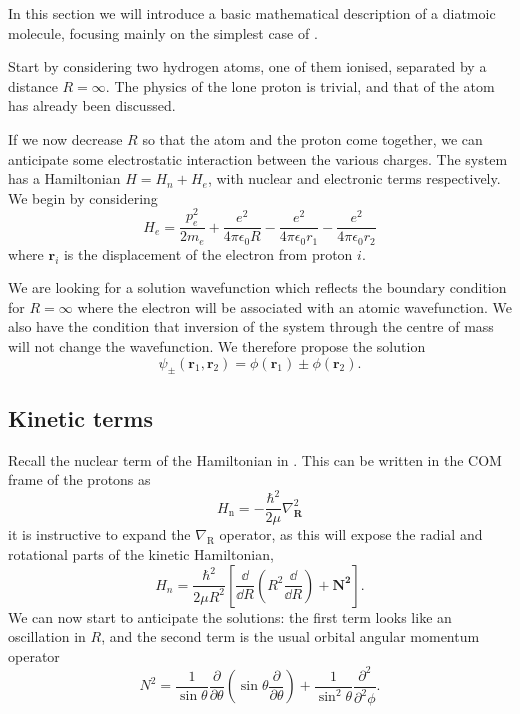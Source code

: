 In this section we will introduce a basic mathematical description of a diatmoic
molecule, focusing mainly on the simplest case of .

Start by considering two hydrogen atoms, one of them ionised, separated by a
distance $R = \infty$. The physics of the lone proton is trivial, and that of
the atom has already been discussed.

If we now decrease $R$ so that the atom and the proton come together, we can
anticipate some electrostatic interaction between the various charges. The
system has a Hamiltonian $H = H_n + H_e$, with nuclear and electronic terms
respectively. We begin by considering
%
\begin{equation}
  H_e = \frac{p^2_e}{2m_e} + \frac{e^2}{4\pi\epsilon_0 R} -
  \frac{e^2}{4\pi\epsilon_0 r_1} - \frac{e^2}{4\pi\epsilon_0 r_2}
\end{equation}
%
where $\mathbf{r}_i$ is the displacement of the electron from proton $i$.

We are looking for a solution wavefunction which reflects the boundary condition
for $R=\infty$ where the electron will be associated with an atomic
wavefunction. We also have the condition that inversion of the system through
the centre of mass will not change the wavefunction. We therefore propose the
solution
%
\begin{equation}
  \psi_\pm(\mathbf{r}_1, \mathbf{r}_2) = \phi(\mathbf{r}_1) \pm \phi(\mathbf{r}_2).
\end{equation}
%


\subsection{Kinetic terms}


Recall the nuclear term of the Hamiltonian in . This can be
written in the COM frame of the protons as
%
\begin{equation}
  H_\text{n} = - \frac{\hbar^2}{2\mu} \nabla^2_\mathbf{R} %
\end{equation}
it is instructive to expand the $\nabla_\mathrm{R}$ operator, as this will
expose the radial and rotational parts of the kinetic Hamiltonian,
\begin{equation}
  H_n = \frac{\hbar^2}{2\mu R^2}\left[ \frac{\dd}{\dd R}\left(R^2
  \frac{\dd}{\dd R}\right) + \mathbf{N^2} \right].
  \label{basics:eq:Hkinetic}
\end{equation}
%
We can now start to anticipate the solutions: the first term looks like an
oscillation in $R$, and the second term is the usual orbital angular momentum
operator
%
\begin{equation}
  N^2 = \frac{1}{\sin\theta}\frac{\partial}{\partial
  \theta}\left(\sin\theta\frac{\partial}{\partial\theta}\right) +
  \frac{1}{\sin^2\theta}\frac{\partial^2}{\partial^2\phi}.
\end{equation}

